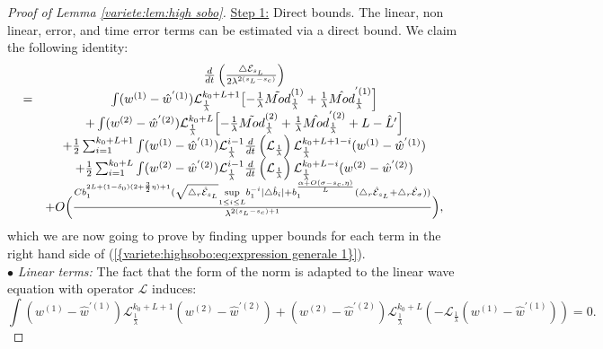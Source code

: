 \documentclass[11pt,a4paper,reqno]{amsart}
\theoremstyle{remark}
\numberwithin{equation}{section}
\begin{document}
\begin{proof}[Proof of Lemma \ref{variete:lem:high sobo}]
\underline{Step 1:} Direct bounds. The linear, non linear, error, and time error terms can be estimated via a direct bound. We claim the following identity:
\begin{equation} \label{variete:highsobo:eq:expression generale 2}
\begin{array}{r c l}
&\frac{d}{dt}\left( \frac{\triangle \mathcal{E}_{s_L}}{2\lambda^{2(s_L-s_c)}} \right) \\
=& \int (w^{(1)}-\hat{w}^{'(1)})\mathcal{L}_{\frac{1}{\lambda}}^{k_0+L+1} \bigl{[}-\frac{1}{\lambda} \tilde{Mod}_{\frac{1}{\lambda}}^{(1)}+\frac{1}{\lambda}\hat{Mod}^{'(1)}_{\frac{1}{\lambda}}  \Bigr{]}\\
&+\int (w^{(2)}-\hat{w}^{'(2)})\mathcal{L}_{\frac{1}{\lambda}}^{k_0+L} \Bigl{[}-\frac{1}{\lambda} \tilde{Mod}_{\frac{1}{\lambda}}^{(2)}+\frac{1}{\lambda}\hat{Mod}_{\frac{1}{\lambda}}^{'(2)}+L-\hat{L}'\Bigr{]}\\
&+\frac{1}{2}\sum_{i=1}^{k_0+L+1} \int (w^{(1)}-\hat{w}^{'(1)}) \mathcal{L}_{\frac{1}{\lambda}}^{i-1}\frac{d}{dt}\left( \mathcal{L}_{\frac{1}{\lambda}}\right)\mathcal{L}_{\frac{1}{\lambda}}^{k_0+L+1-i} (w^{(1)}-\hat{w}^{'(1)}) \\
&+\frac{1}{2}\sum_{i=1}^{k_0+L} \int (w^{(2)}-\hat{w}^{'(2)}) \mathcal{L}_{\frac{1}{\lambda}}^{i-1}\frac{d}{dt}\left( \mathcal{L}_{\frac{1}{\lambda}}\right) \mathcal{L}_{\frac{1}{\lambda}}^{k_0+L-i} (w^{(2)}-\hat{w}^{'(2)}) \\
&+O\Bigl{(}\frac{Cb_1^{2L+(1-\delta_0)(2+\frac{3}{2}\eta)+1}(\sqrt{\triangle_r \hat{\mathcal{E}}_{s_L}}\underset{1\leq i \leq L}{\text{sup}}b_1^{-i}|\triangle \hat{b}_i|+b_1^{\frac{\alpha+O(\sigma-s_c,\eta)}{L}}(\triangle_r \hat{\mathcal{E}}_{s_L}+\triangle_r \hat{\mathcal{E}}_{\sigma}))}{\lambda^{2(s_L-s_c)+1}} \Bigr{)},
\end{array}
\end{equation}
which we are now going to prove by finding upper bounds for each term in the right hand side of {{\rm (\ref{{variete:highsobo:eq:expression generale 1}})}}.\\
$\bullet$ \emph{Linear terms:} The fact that the form of the norm is adapted to the linear wave equation with operator $\mathcal{L}$ induces:
\begin{equation} \label{variete:highsobo:eq:estimation lineaire} 
\int (w^{(1)}-\hat{w}^{'(1)}) \mathcal{L}_{\frac{1}{\lambda}}^{k_0+L+1}(w^{(2)}-\hat{w}^{'(2)})+(w^{(2)}-\hat{w}^{'(2)}) \mathcal{L}_{\frac{1}{\lambda}}^{k_0+L}(-\mathcal{L}_{\frac{1}{\lambda}}(w^{(1)}-\hat{w}^{'(1)}))=0 .
\end{equation}

\end{proof}
\end{document}

